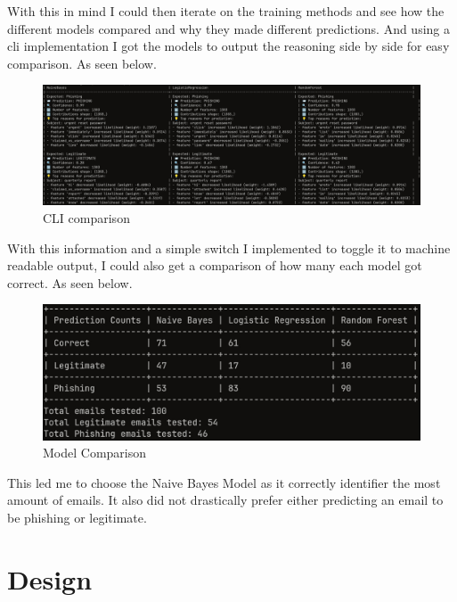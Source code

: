 \documentclass[a4paper,10pt]{article}
\begin{document}
With this in mind I could then iterate on the training methods and see how the
different models compared and why they made different predictions. And using a
cli implementation I got the models to output the reasoning side by side for
easy comparison. As seen below. \par


\begin{figure}[ht!]
	\centering
	\includegraphics[width=1\textwidth]{doc-img/human_readable_output.jpg}
	\caption{CLI comparison}
	\label{fig:human_readable_output}
\end{figure}

With this information and a simple switch I implemented to toggle it to machine
readable output, I could also get a comparison of how many each model got
correct. As seen below. \par


\begin{figure}[ht!]
	\centering
	\includegraphics[width=1\textwidth]{doc-img/model-comparison-cli.jpg}
	\caption{Model Comparison}
	\label{fig:model-comparison-cli}
\end{figure}

This led me to choose the Naive Bayes Model as it correctly identifier the most
amount of emails. It also did not drastically prefer either predicting an email
to be phishing or legitimate.

\section{Design}
\end{document}
